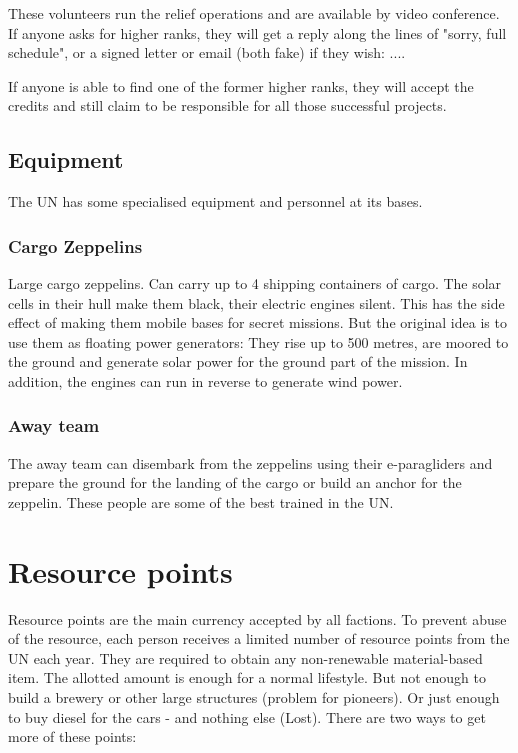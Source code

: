 These volunteers run the relief operations and are available by video conference. If anyone asks for higher ranks, they will get a reply along the lines of "sorry, full schedule", or a signed letter or email (both fake) if they wish: ....

If anyone is able to find one of the former higher ranks, they will accept the credits and still claim to be responsible for all those successful projects.

\subsection{Equipment}

The UN has some specialised equipment and personnel at its bases.

\subsubsection{Cargo Zeppelins}
\label{sec:UN Cargo Zeppelins}
Large cargo zeppelins. Can carry up to 4 shipping containers of cargo. The solar cells in their hull make them black, their electric engines silent. This has the side effect of making them mobile bases for secret missions. But the original idea is to use them as floating power generators: They rise up to 500 metres, are moored to the ground and generate solar power for the ground part of the mission. In addition, the engines can run in reverse to generate wind power.

\subsubsection{Away team}
\label{sec:UN away team}
The away team can disembark from the zeppelins using their e-paragliders and prepare the ground for the landing of the cargo or build an anchor for the zeppelin. These people are some of the best trained in the UN.

\section{Resource points}
\label{sec:Resource Points}
Resource points are the main currency accepted by all factions. To prevent abuse of the resource, each person receives a limited number of resource points from the UN each year. They are required to obtain any non-renewable material-based item. The allotted amount is enough for a normal lifestyle. But not enough to build a brewery or other large structures (problem for pioneers). Or just enough to buy diesel for the cars - and nothing else (Lost). There are two ways to get more of these points:

